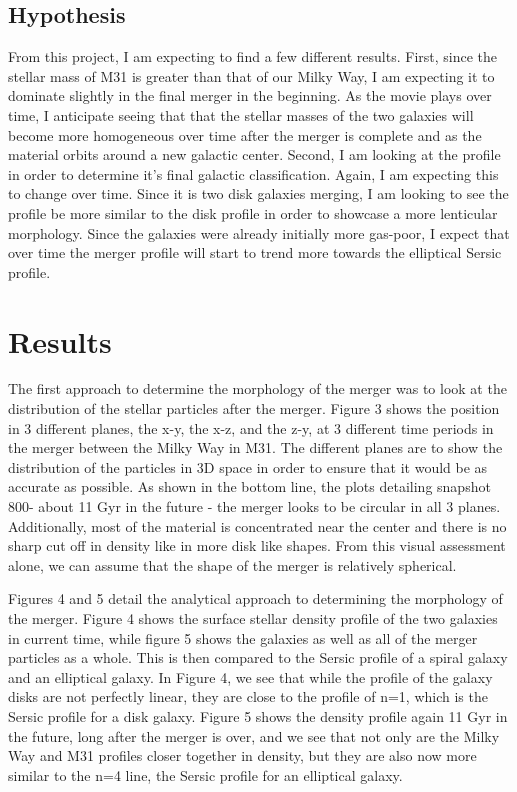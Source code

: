 \documentclass[twocolumn]{aastex63}
\begin{document}
\subsection{Hypothesis}
From this project, I am expecting to find a few different results. First, since the stellar mass of M31 is greater than that of our Milky Way, I am expecting it to dominate slightly in the final merger in the beginning. As the movie plays over time, I anticipate seeing that that the stellar masses of the two galaxies will become more homogeneous over time after the merger is complete and as the material orbits around a new galactic center. Second, I am looking at the profile in order to determine it's final galactic classification. Again, I am expecting this to change over time. Since it is two disk galaxies merging, I am looking to see the profile be more similar to the disk profile in order to showcase a more lenticular morphology. Since the galaxies were already initially more gas-poor, I expect that over time the merger profile will start to trend more towards the elliptical Sersic profile. 


\section{Results}


The first approach to determine the morphology of the merger was to look at the distribution of the stellar particles after the merger. Figure 3 shows the position in 3 different planes, the x-y, the x-z, and the z-y, at 3 different time periods in the merger between the Milky Way in M31. The different planes are to show the distribution of the particles in 3D space in order to ensure that it would be as accurate as possible.  As shown in the bottom line, the plots detailing snapshot 800- about 11 Gyr in the future - the merger looks to be circular in all 3 planes. Additionally, most of the material is concentrated near the center and there is no sharp cut off in density like in more disk like shapes. From this visual assessment alone, we can assume that the shape of the merger is relatively spherical. 


\medskip


Figures 4 and 5 detail the analytical approach to determining the morphology of the merger. Figure 4 shows the surface stellar density profile of the two galaxies in current time, while figure 5 shows the galaxies as well as all of the merger particles as a whole. This is then compared to the Sersic profile of a spiral galaxy and an elliptical galaxy. In Figure 4, we see that while the profile of the galaxy disks are not perfectly linear, they are close to the profile of n=1, which is the Sersic profile for a disk galaxy. Figure 5 shows the density profile again 11 Gyr in the future, long after the merger is over, and we see that not only are the Milky Way and M31 profiles closer together in density, but they are also now more similar to the n=4 line, the Sersic profile for an elliptical galaxy. 
\end{document}
